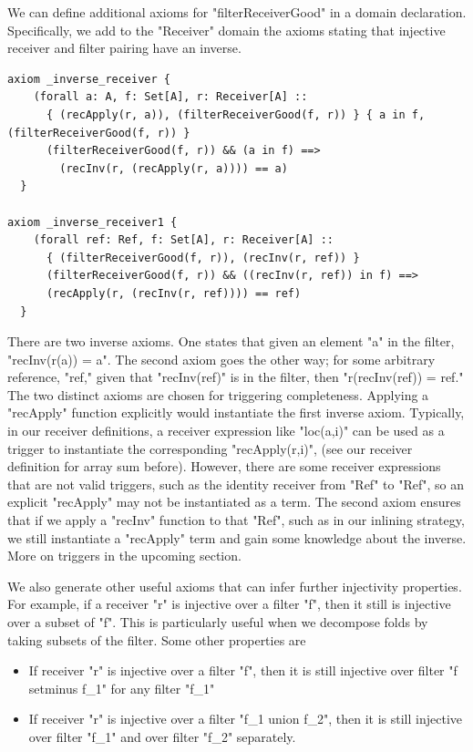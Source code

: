 \documentclass[msc,oneside]{ubcthesis}
\theoremstyle{definition}
\begin{document}
We can define additional axioms for "filterReceiverGood" in a domain declaration. Specifically, we add to the "Receiver" domain the axioms stating that injective receiver and filter pairing have an inverse. 
\begin{lstlisting}
axiom _inverse_receiver {
    (forall a: A, f: Set[A], r: Receiver[A] ::
      { (recApply(r, a)), (filterReceiverGood(f, r)) } { a in f, (filterReceiverGood(f, r)) }
      (filterReceiverGood(f, r)) && (a in f) ==>
        (recInv(r, (recApply(r, a)))) == a)
  }
  
axiom _inverse_receiver1 {
    (forall ref: Ref, f: Set[A], r: Receiver[A] ::
      { (filterReceiverGood(f, r)), (recInv(r, ref)) }
      (filterReceiverGood(f, r)) && ((recInv(r, ref)) in f) ==>
      (recApply(r, (recInv(r, ref)))) == ref)
  }
\end{lstlisting}
There are two inverse axioms. One states that given an element "a" in the filter, "recInv(r(a)) = a". The second axiom goes the other way; for some arbitrary reference, "ref," given that "recInv(ref)" is in the filter, then "r(recInv(ref)) = ref." The two distinct axioms are chosen for triggering completeness. Applying a "recApply" function explicitly would instantiate the first inverse axiom. Typically, in our receiver definitions, a receiver expression like "loc(a,i)" can be used as a trigger to instantiate the corresponding "recApply(r,i)",   (see our receiver definition for array sum before). However, there are some receiver expressions that are not valid triggers, such as the identity receiver from "Ref" to "Ref", so an explicit "recApply" may not be instantiated as a term. The second axiom ensures that if we apply a "recInv" function to that "Ref", such as in our inlining strategy, we still instantiate a "recApply" term and gain some knowledge about the inverse. More on triggers in the upcoming section.

We also generate other useful axioms that can infer further injectivity properties. For example, if a receiver "r" is injective over a filter "f", then it still is injective over a subset of "f". This is particularly useful when we decompose folds by taking subsets of the filter. Some other properties are
\begin{itemize}
    \item If receiver "r" is injective over a filter "f", then it is still injective over filter "f setminus f_1" for any filter "f_1"
    \item If receiver "r" is injective over a filter "f_1 union f_2", then it is still injective over filter "f_1" and over filter "f_2" separately. 
\end{itemize}
\end{document}
